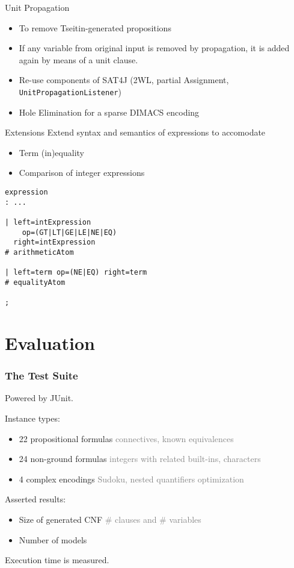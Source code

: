 \documentclass[smaller,dvipsnames,ratio=169]{beamer}
\begin{document}
  \begin{frame}{Unit Propagation}
    \begin{itemize}
      \item To remove Tseitin-generated propositions
      \item If any variable from original input is removed by propagation, it is added  again by means of a unit clause.
      \item Re-use components of SAT4J (2WL, partial Assignment, \texttt{UnitPropagationListener})
      \item \alert{Hole Elimination} for a sparse DIMACS encoding
    \end{itemize}
  \end{frame}

  \begin{frame}[fragile]{Extensions}
    Extend syntax and semantics of expressions to accomodate
    \begin{itemize}
      \item Term (in)\alert{equality}
      \item \alert{Comparison} of integer expressions
    \end{itemize}
    \begin{verbatim}
expression
: ...

| left=intExpression
    op=(GT|LT|GE|LE|NE|EQ)
  right=intExpression
# arithmeticAtom

| left=term op=(NE|EQ) right=term
# equalityAtom

;
    \end{verbatim}
\end{frame}

  \section{Evaluation}

  \begin{frame}
    \frametitle{The Test Suite}
    Powered by \alert{JUnit}.

    Instance types:
    \begin{itemize}
      \item 22 propositional formulas \textcolor{gray}{connectives, known equivalences}
      \item 24 non-ground formulas \textcolor{gray}{integers with related built-ins, characters}
      \item 4 complex encodings \textcolor{gray}{Sudoku, nested quantifiers optimization}
    \end{itemize}
    Asserted results:
    \begin{itemize}
      \item \alert{Size} of generated CNF \textcolor{gray}{\# clauses and \# variables}
      \item Number of \alert{models}
    \end{itemize}
    Execution \alert{time} is measured.
  \end{frame}
\end{document}
